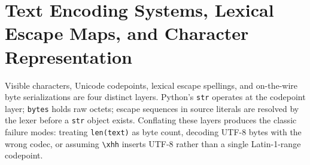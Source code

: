 \section{Text Encoding Systems, Lexical Escape Maps, and Character Representation}

Visible characters, Unicode codepoints, lexical escape spellings, and on-the-wire byte serializations are four distinct layers. Python's \texttt{str} operates at the codepoint layer; \texttt{bytes} holds raw octets; escape sequences in source literals are resolved by the lexer before a \texttt{str} object exists. Conflating these layers produces the classic failure modes: treating \texttt{len(text)} as byte count, decoding UTF-8 bytes with the wrong codec, or assuming \texttt{\textbackslash xhh} inserts UTF-8 rather than a single Latin-1-range codepoint.
